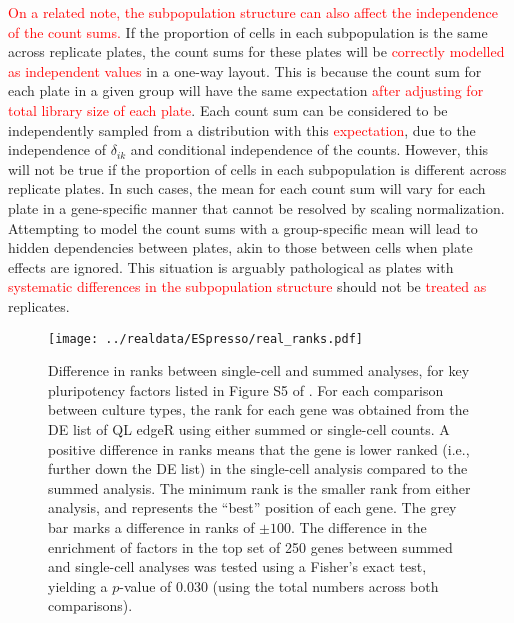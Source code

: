 \documentclass{article}
\newcommand\revised[1]{\textcolor{red}{#1}}
\begin{document}
\revised{On a related note, the subpopulation structure can also affect the independence of the count sums.}
If the proportion of cells in each subpopulation is the same across replicate plates, the count sums for these plates will be \revised{correctly modelled as independent values} in a one-way layout.
This is because the count sum for each plate in a given group will have the same expectation \revised{after adjusting for total library size of each plate}.
Each count sum can be considered to be independently sampled from a distribution with this \revised{expectation}, due to the independence of $\delta_{ik}$ and conditional independence of the counts.
However, this will not be true if the proportion of cells in each subpopulation is different across replicate plates.
In such cases, the mean for each count sum will vary for each plate in a gene-specific manner that cannot be resolved by scaling normalization.
Attempting to model the count sums with a group-specific mean will lead to hidden dependencies between plates, akin to those between cells when plate effects are ignored.
This situation is arguably pathological as plates with \revised{systematic differences in the subpopulation structure} should not be \revised{treated as} replicates.


\begin{figure}[p]
\begin{center}
    \texttt{[image: ../realdata/ESpresso/real\_ranks.pdf]}
\end{center}
\caption{
    Difference in ranks between single-cell and summed analyses, for key pluripotency factors listed in Figure S5 of \cite{kolod2015single}.
    For each comparison between culture types, the rank for each gene was obtained from the DE list of QL edgeR using either summed or single-cell counts.
    A positive difference in ranks means that the gene is lower ranked (i.e., further down the DE list) in the single-cell analysis compared to the summed analysis.
    The minimum rank is the smaller rank from either analysis, and represents the ``best'' position of each gene.
    The grey bar marks a difference in ranks of $\pm100$.
    The difference in the enrichment of factors in the top set of 250 genes between summed and single-cell analyses was tested using a Fisher's exact test, yielding a $p$-value of 0.030 (using the total numbers across both comparisons). 
}
\end{figure}
\end{document}
